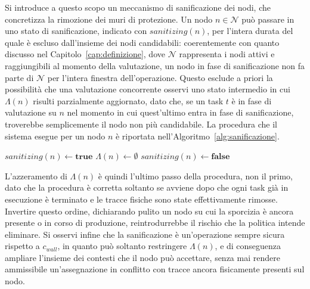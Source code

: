 Si introduce a questo scopo un meccanismo di sanificazione dei nodi, che concretizza la rimozione dei muri di protezione. Un nodo $n \in \mathcal{N}$ può passare in uno stato di sanificazione, indicato con $sanitizing(n)$, per l'intera durata del quale è escluso dall'insieme dei nodi candidabili: coerentemente con quanto discusso nel Capitolo~\ref{cap:definizione}, dove $\mathcal{N}$ rappresenta i nodi attivi e raggiungibili al momento della valutazione, un nodo in fase di sanificazione non fa parte di $\mathcal{N}$ per l'intera finestra dell'operazione. Questo esclude a priori la possibilità che una valutazione concorrente osservi uno stato intermedio in cui $\Lambda(n)$ risulti parzialmente aggiornato, dato che, se un task $t$ è in fase di valutazione su $n$ nel momento in cui quest'ultimo entra in fase di sanificazione, troverebbe semplicemente il nodo non più candidabile. La procedura che il sistema esegue per un nodo $n$ è riportata nell'Algoritmo~\ref{alg:sanificazione}.

\begin{algorithm}
    \caption{Sanificazione di un nodo}
    \label{alg:sanificazione}
    \begin{algorithmic}
            \State $sanitizing(n) \leftarrow \mathbf{true}$ 
            \State {} 
            \State {} 
            \State $\Lambda(n) \leftarrow \emptyset$
            \State $sanitizing(n) \leftarrow \mathbf{false}$ 
        \EndProcedure
    \end{algorithmic}
\end{algorithm}

L'azzeramento di $\Lambda(n)$ è quindi l'ultimo passo della procedura, non il primo, dato che la procedura è corretta soltanto se avviene dopo che ogni task già in esecuzione è terminato e le tracce fisiche sono state effettivamente rimosse. Invertire questo ordine, dichiarando pulito un nodo su cui la sporcizia è ancora presente o in corso di produzione, reintrodurrebbe il rischio che la politica intende eliminare. Si osservi infine che la sanificazione è un'operazione sempre sicura rispetto a $c_{wall}$, in quanto può soltanto restringere $\Lambda(n)$, e di conseguenza ampliare l'insieme dei contesti che il nodo può accettare, senza mai rendere ammissibile un'assegnazione in conflitto con tracce ancora fisicamente presenti sul nodo.

